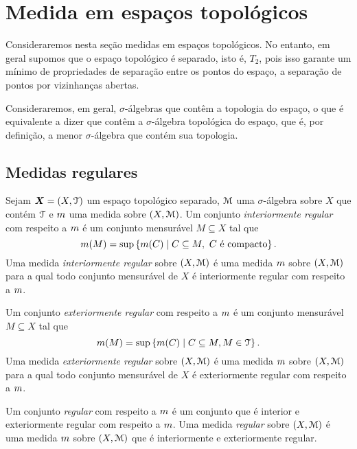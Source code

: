 \section{Medida em espaços topológicos}

Consideraremos nesta seção medidas em espaços topológicos. No entanto, em geral supomos que o espaço topológico é separado, isto é, $T_2$, pois isso garante um mínimo de propriedades de separação entre os pontos do espaço, a separação de pontos por vizinhanças abertas.

Consideraremos, em geral, $\sigma$-álgebras que contêm a topologia do espaço, o que é equivalente a dizer que contêm a $\sigma$-álgebra topológica do espaço, que é, por definição, a menor $\sigma$-álgebra que contém sua topologia.

\subsection{Medidas regulares}

\begin{definition}
Sejam $\bm X = (X,\mathcal{T})$ um espaço topológico separado, $\mathcal{M}$ uma $\sigma$-álgebra sobre $X$ que contém $\mathcal{T}$ e $m$ uma medida sobre $(X,\mathcal{M})$. Um conjunto \emph{interiormente regular} com respeito a $m$ é um conjunto mensurável $M \subseteq X$ tal que
	\begin{equation*}
	m(M) = \sup\left\{{m(C)}\;\middle\vert\;{C \subseteq M,\text{ $C$ é compacto}}\right\}.
	\end{equation*}
Uma medida \emph{interiormente regular} sobre $(X,\mathcal{M})$ é uma medida $m$ sobre $(X,\mathcal{M})$ para a qual todo conjunto mensurável de $X$ é interiormente regular com respeito a $m$.

Um conjunto \emph{exteriormente regular} com respeito a $m$ é um conjunto mensurável $M \subseteq X$ tal que
	\begin{equation*}
	m(M) = \sup\left\{{m(C)}\;\middle\vert\;{C \subseteq M, M \in \mathcal{T}}\right\}.
	\end{equation*}
Uma medida \emph{exteriormente regular} sobre $(X,\mathcal{M})$ é uma medida $m$ sobre $(X,\mathcal{M})$ para a qual todo conjunto mensurável de $X$ é exteriormente regular com respeito a $m$.

Um conjunto \emph{regular} com respeito a $m$ é um conjunto que é interior e exteriormente regular com respeito a $m$. Uma medida \emph{regular} sobre $(X,\mathcal{M})$ é uma medida $m$ sobre $(X,\mathcal{M})$ que é interiormente e exteriormente regular.
\end{definition}

